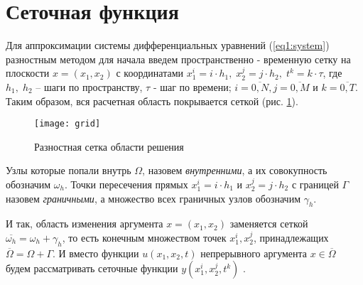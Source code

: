 \section{Сеточная функция} \label{grid}
Для аппроксимации системы дифференциальных уравнений (\ref{eq1:system}) разностным методом для начала введем пространственно - временную сетку на плоскости $x = (x_{1},x_{2})$ с координатами $x^{i}_{1} = i \cdot h_{1},\; x^{j}_{2} = j \cdot h_{2} , \; t^{k} = k \cdot \tau $, где $h_{1},\; h_{2}$ -- шаги по пространству, $\tau$ - шаг по времени; $i = \overline{0,N}, j = \overline{0,M}$ и $k = \overline{0,T}$. Таким образом, вся расчетная область покрывается сеткой (рис. \ref{fig:grid}).

\begin{figure}[ht]
    \centering
    \texttt{[image: grid]}
    \captionsetup{justification=centering,margin=2cm}
    \caption{Разностная сетка области решения}
    \label{fig:grid}
\end{figure}

 Узлы которые попали внутрь $\Omega$, назовем \textit{внутренними}, а их совокупность обозначим $\omega_{h}$. Точки пересечения прямых $x^{i}_{1} = i \cdot h_{1}$ и $x^{j}_{2} = j \cdot h_{2}$ с границей $\Gamma$ назовем \textit{граничными}, а множество всех граничных узлов обозначим $\gamma_{h}$.
 
 И так, область изменения аргумента $x = (x_{1},x_{2})$ заменяется сеткой  $ \overline{\omega_{h}} = \omega_{h} + \gamma_{h}$, то есть конечным множеством точек $x^{i}_{1}, x^{j}_{2}$, принадлежащих $\overline{\Omega} = \Omega + \Gamma$. И вместо функции $u(x_{1},x_{2},t)$ непрерывного аргумента $x \in \overline{\Omega} $ будем рассматривать сеточные функции $y(x^{i}_{1},x^{j}_{2},t^{k})$ \cite[Самарский][67]{Samarskiy1977}.
